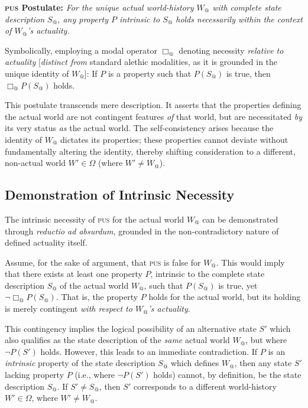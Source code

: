 \documentclass[11pt, a4paper]{article}
\makeatletter
\newcommand{\pus}{\textsc{pus}} %
\newcommand{\Wactual}{W_{@}} %
\newcommand{\Sactual}{S_{@}} %
\newcommand{\Omegaset}{\Omega} %
\newcommand{\BoxActual}{\Box_{@}} %
\makeatother
\begin{document}
\textbf{\pus{} Postulate:} \textit{For the unique actual world-history $\Wactual$ with complete state description $\Sactual$, any property $P$ intrinsic to $\Sactual$ holds necessarily within the context of $\Wactual$'s actuality.}

Symbolically, employing a modal operator $\BoxActual$ denoting necessity \textit{relative to actuality} [\textit{distinct from} standard alethic modalities, as it is grounded in the unique identity of $\Wactual$]:
If $P$ is a property such that $P(\Sactual)$ is true, then $\BoxActual P(\Sactual)$ holds.

This postulate transcends mere description. It asserts that the properties defining the actual world are not contingent features \textit{of} that world, but are necessitated \textit{by} its very status \textit{as} the actual world. The self-consistency arises because the identity of $\Wactual$ dictates its properties; these properties cannot deviate without fundamentally altering the identity, thereby shifting consideration to a different, non-actual world $W' \in \Omegaset$ (where $W' \neq \Wactual$).

\subsection{Demonstration of Intrinsic Necessity}
The intrinsic necessity of \pus{} for the actual world $\Wactual$ can be demonstrated through \textit{reductio ad absurdum}, grounded in the non-contradictory nature of defined actuality itself.

Assume, for the sake of argument, that \pus{} is false for $\Wactual$. This would imply that there exists at least one property $P$, intrinsic to the complete state description $\Sactual$ of the actual world $\Wactual$, such that $P(\Sactual)$ is true, yet $\neg \BoxActual P(\Sactual)$. That is, the property $P$ holds for the actual world, but its holding is merely contingent \textit{with respect to $\Wactual$'s actuality}.

This contingency implies the logical possibility of an alternative state $S'$ which also qualifies as the state description of the \textit{same} actual world $\Wactual$, but where $\neg P(S')$ holds. However, this leads to an immediate contradiction. If $P$ is an \textit{intrinsic} property of the state description $\Sactual$ which defines $\Wactual$, then any state $S'$ lacking property $P$ (i.e., where $\neg P(S')$ holds) cannot, by definition, be the state description $\Sactual$. If $S' \neq \Sactual$, then $S'$ corresponds to a different world-history $W' \in \Omegaset$, where $W' \neq \Wactual$.
\end{document}
